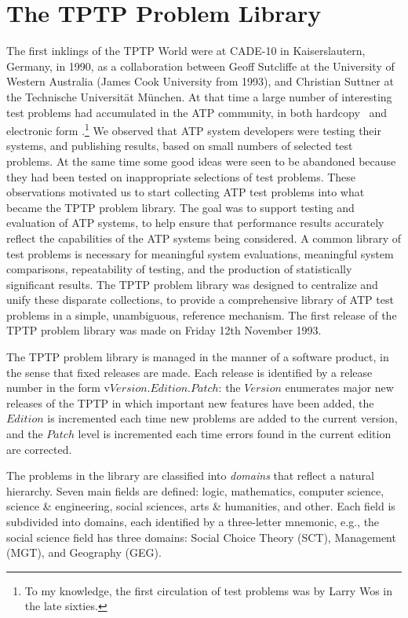 \documentclass{easychair}
\begin{document}
\section{The TPTP Problem Library}
\label{TPTP}

The first inklings of the TPTP World were at CADE-10 in Kaiserslautern, Germany, in 1990, as a 
collaboration between Geoff Sutcliffe at the University of Western Australia (James Cook 
University from 1993), and Christian Suttner at the Technische Universit{\"a}t M{\"u}nchen.
At that time a large number of interesting test problems had accumulated in the ATP community, in
both hardcopy~\cite{MOW76,WM76,Pel86-JAR,BL+86,Qua92-JAR,MW92-CADE-11} and electronic form
\cite{ANL,SPRFN}.\footnote{To my knowledge, the first circulation of test problems was by 
Larry Wos in the late sixties.} 
We observed that ATP system developers were testing their systems, and publishing results, 
based on small numbers of selected test problems.
At the same time some good ideas were seen to be abandoned because they had been tested on
inappropriate selections of test problems.
These observations motivated us to start collecting ATP test problems into what became the TPTP 
problem library.
The goal was to support testing and evaluation of ATP systems, to help ensure that performance 
results accurately reflect the capabilities of the ATP systems being considered. 
A common library of test problems is necessary for meaningful system evaluations, meaningful system 
comparisons, repeatability of testing, and the production of statistically significant results. 
The TPTP problem library was designed to centralize and unify these disparate collections, 
to provide a comprehensive library of ATP test problems in a simple, unambiguous, reference 
mechanism.
The first release of the TPTP problem library was made on Friday 12th November 1993. 

The TPTP problem library is managed in the manner of a software product, in the sense that fixed 
releases are made.
Each release is identified by a release number in the form v$Version$.$Edition$.$Patch$:
the $Version$ enumerates major new releases of the TPTP in which important new features have 
been added,
the $Edition$ is incremented each time new problems are added to the current version, and
the $Patch$ level is incremented each time errors found in the current edition are corrected. 

The problems in the library are classified into {\em domains} that reflect a natural hierarchy.
Seven main fields are defined: logic, mathematics, computer science, science \& engineering, 
social sciences, arts \& humanities, and other. 
Each field is subdivided into domains, each identified by a three-letter mnemonic, e.g., the
social science field has three domains: Social Choice Theory (SCT), Management (MGT), and
Geography (GEG).
\end{document}
